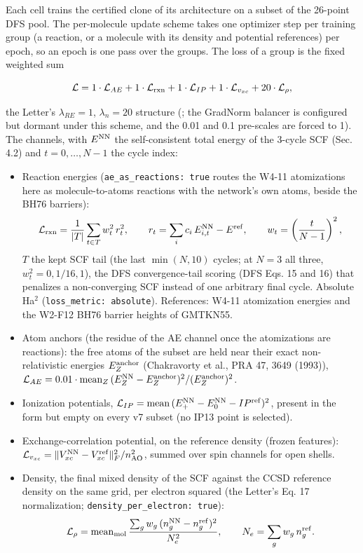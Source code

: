 \documentclass[10pt,a4paper]{article}
\begin{document}
Each cell trains the certified clone of its architecture on a subset of the 26-point DFS pool. The per-molecule update scheme takes one optimizer step per training group (a reaction, or a molecule with its density and potential references) per epoch, so an epoch is one pass over the groups. The loss of a group is the fixed weighted sum

\[
\mathcal{L} = 1\cdot\mathcal{L}_{AE} + 1\cdot\mathcal{L}_{\rm rxn} + 1\cdot\mathcal{L}_{IP} + 1\cdot\mathcal{L}_{v_{xc}} + 20\cdot\mathcal{L}_{\rho},
\]

the Letter's $\lambda_{RE} = 1$, $\lambda_n = 20$ structure (; the GradNorm balancer is configured but dormant under this scheme, and the  0.01 and  0.1 pre-scales are forced to 1). The channels, with $E^{\rm NN}$ the self-consistent total energy of the 3-cycle SCF (Sec. 4.2) and $t = 0, \ldots, N-1$ the cycle index:

\begin{itemize}
\item Reaction energies (\texttt{ae\_as\_reactions: true} routes the W4-11 atomizations here as molecule-to-atoms reactions with the network's own atoms, beside the BH76 barriers): \[
\mathcal{L}_{\rm rxn} = \frac{1}{|T|}\sum_{t\in T} w_t^2\, r_t^2, \qquad
r_t = \sum_i c_i\, E^{\rm NN}_{i,t} - E^{\rm ref}, \qquad
w_t = \left(\frac{t}{N-1}\right)^2,
\] $T$ the kept SCF tail (the last $\min(N, 10)$ cycles; at $N = 3$ all three, $w_t^2 = 0, 1/16, 1$), the DFS convergence-tail scoring (DFS Eqs. 15 and 16) that penalizes a non-converging SCF instead of one arbitrary final cycle. Absolute Ha$^2$ (\texttt{loss\_metric: absolute}). References: W4-11 atomization energies and the W2-F12 BH76 barrier heights of GMTKN55.
\item Atom anchors (the residue of the AE channel once the atomizations are reactions): the free atoms of the subset are held near their exact non-relativistic energies $E_Z^{\rm anchor}$ (Chakravorty et al., PRA 47, 3649 (1993)), $\mathcal{L}_{AE} = 0.01\cdot\mathrm{mean}_Z\, (E_Z^{\rm NN} - E_Z^{\rm anchor})^2 / (E_Z^{\rm anchor})^2$.
\item Ionization potentials, $\mathcal{L}_{IP} = \mathrm{mean}\,(E^{\rm NN}_{+} - E^{\rm NN}_0 - IP^{\rm ref})^2$, present in the form but empty on every v7 subset (no IP13 point is selected).
\item Exchange-correlation potential, on the reference density (frozen features): $\mathcal{L}_{v_{xc}} = \|V_{xc}^{\rm NN} - V_{xc}^{\rm ref}\|_F^2 / n_{\rm AO}^2$, summed over spin channels for open shells.
\item Density, the final mixed density of the SCF against the CCSD reference density on the same grid, per electron squared (the Letter's Eq. 17 normalization; \texttt{density\_per\_electron: true}): \[
\mathcal{L}_{\rho} = \mathrm{mean}_{\rm mol}\,\frac{\sum_g w_g\,(n^{\rm NN}_g - n^{\rm ref}_g)^2}{N_e^2},
\qquad N_e = \sum_g w_g\, n^{\rm ref}_g .
\]
\end{itemize}
\end{document}
